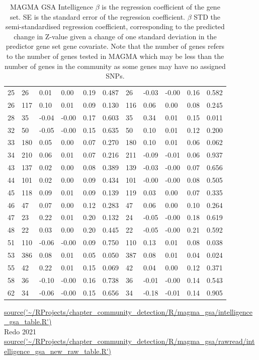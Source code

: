 \begin{table}[ht]
\begin{tabular}{cllllllllll}
  25 & 26 & 0.01 & 0.00 & 0.19 & 0.487 & 26 & -0.03 & -0.00 & 0.16 & 0.582 \\ 
  26 & 117 & 0.10 & 0.01 & 0.09 & 0.130 & 116 & 0.06 & 0.00 & 0.08 & 0.245 \\ 
  28 & 35 & -0.04 & -0.00 & 0.17 & 0.603 & 35 & 0.34 & 0.01 & 0.15 & 0.011 \\ 
  32 & 50 & -0.05 & -0.00 & 0.15 & 0.635 & 50 & 0.10 & 0.01 & 0.12 & 0.200 \\ 
  33 & 180 & 0.05 & 0.00 & 0.07 & 0.270 & 180 & 0.10 & 0.01 & 0.06 & 0.062 \\ 
  34 & 210 & 0.06 & 0.01 & 0.07 & 0.216 & 211 & -0.09 & -0.01 & 0.06 & 0.937 \\ 
  43 & 137 & 0.02 & 0.00 & 0.08 & 0.389 & 139 & -0.03 & -0.00 & 0.07 & 0.656 \\ 
  44 & 101 & 0.02 & 0.00 & 0.09 & 0.434 & 101 & -0.00 & -0.00 & 0.08 & 0.505 \\ 
  45 & 118 & 0.09 & 0.01 & 0.09 & 0.139 & 119 & 0.03 & 0.00 & 0.07 & 0.335 \\ 
  46 & 47 & 0.07 & 0.00 & 0.12 & 0.283 & 47 & 0.06 & 0.00 & 0.10 & 0.264 \\ 
  47 & 23 & 0.22 & 0.01 & 0.20 & 0.132 & 24 & -0.05 & -0.00 & 0.18 & 0.619 \\ 
  48 & 22 & 0.03 & 0.00 & 0.20 & 0.445 & 22 & -0.05 & -0.00 & 0.21 & 0.592 \\ 
  51 & 110 & -0.06 & -0.00 & 0.09 & 0.750 & 110 & 0.13 & 0.01 & 0.08 & 0.038 \\ 
  53 & 386 & 0.08 & 0.01 & 0.05 & 0.050 & 387 & 0.08 & 0.01 & 0.04 & 0.024 \\ 
  55 & 42 & 0.22 & 0.01 & 0.15 & 0.069 & 42 & 0.04 & 0.00 & 0.12 & 0.371 \\ 
  58 & 36 & -0.10 & -0.00 & 0.16 & 0.738 & 36 & -0.01 & -0.00 & 0.14 & 0.543 \\ 
  62 & 34 & -0.06 & -0.00 & 0.15 & 0.656 & 34 & -0.18 & -0.01 & 0.14 & 0.905 \\ 
   \bottomrule
\end{tabular}
\caption[MAGMA GSA Intelligence]{MAGMA GSA Intelligence  $\beta$ is the regression coefficient of the gene set. SE is the standard error of the regression coefficient. $\beta$ STD the semi-standardised regression coefficient, corresponding to the predicted
change in Z-value given a change of one standard deviation in the predictor gene set  gene covariate.  Note that the number of genes refers to the number of genes tested in MAGMA which may be less than the number of genes in the community as some genes may have no assigned SNPs.} 

\tiny\url{source('~/RProjects/chapter_community_detection/R/magma_gsa/intelligence_gsa_table.R')}\\
Redo 2021 \url{source('~/RProjects/chapter_community_detection/R/magma_gsa/rawread/intelligence_gsa_new_raw_table.R')}
\label{tab:MAGMA GSA Intelligence }
\end{table}



